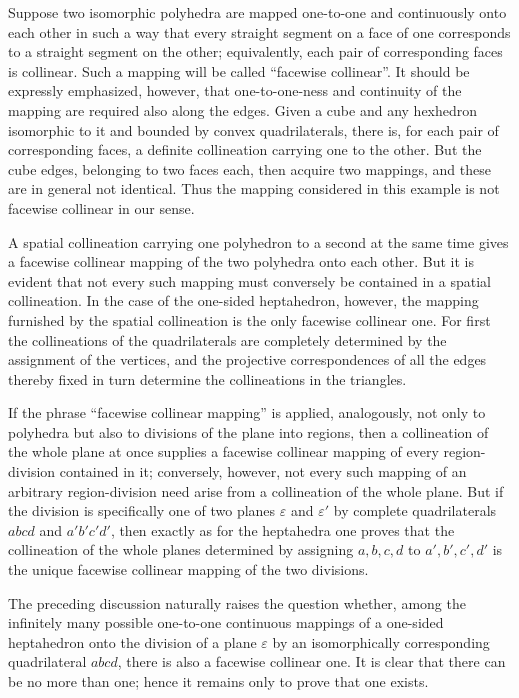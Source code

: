 \documentclass[11pt,a4paper]{article}
\begin{document}
Suppose two isomorphic polyhedra are mapped one-to-one and continuously onto each other in such a way that every straight segment on a face of one corresponds to a straight segment on the other; equivalently, each pair of corresponding faces is collinear. Such a mapping will be called ``facewise collinear''. It should be expressly emphasized, however, that one-to-one-ness and continuity of the mapping are required also along the edges. Given a cube and any hexhedron isomorphic to it and bounded by convex quadrilaterals, there is, for each pair of corresponding faces, a definite collineation carrying one to the other. But the cube edges, belonging to two faces each, then acquire two mappings, and these are in general not identical. Thus the mapping considered in this example is not facewise collinear in our sense.

A spatial collineation carrying one polyhedron to a second at the same time gives a facewise collinear mapping of the two polyhedra onto each other. But it is evident that not every such mapping must conversely be contained in a spatial collineation. In the case of the one-sided heptahedron, however, the mapping furnished by the spatial collineation is the only facewise collinear one. For first the collineations of the quadrilaterals are completely determined by the assignment of the vertices, and the projective correspondences of all the edges thereby fixed in turn determine the collineations in the triangles.

If the phrase ``facewise collinear mapping'' is applied, analogously, not only to polyhedra but also to divisions of the plane into regions, then a collineation of the whole plane at once supplies a facewise collinear mapping of every region-division contained in it; conversely, however, not every such mapping of an arbitrary region-division need arise from a collineation of the whole plane. But if the division is specifically one of two planes $\varepsilon$ and $\varepsilon'$ by complete quadrilaterals $abcd$ and $a'b'c'd'$, then exactly as for the heptahedra one proves that the collineation of the whole planes determined by assigning $a,b,c,d$ to $a',b',c',d'$ is the unique facewise collinear mapping of the two divisions.

The preceding discussion naturally raises the question whether, among the infinitely many possible one-to-one continuous mappings of a one-sided heptahedron onto the division of a plane $\varepsilon$ by an isomorphically corresponding quadrilateral $abcd$, there is also a facewise collinear one. It is clear that there can be no more than one; hence it remains only to prove that one exists.
\end{document}
